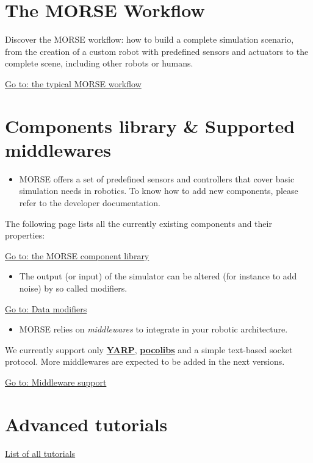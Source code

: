 \documentclass[twoside,a4paper,10pt]{report}
\newcommand{\dokutitleleveltwo}[1]{\section{#1}}
\newcommand{\dokubold}[1]{\textbf{#1}}
\newcommand{\dokuitalic}[1]{\textsl{#1}}
\newcommand{\dokuitem}{\item}
\begin{document}
\dokutitleleveltwo{The MORSE Workflow}
\label{2963f1f90771a121484ee5fd4a4251c0}%

Discover the MORSE workflow: how to build a complete simulation scenario, from 
the creation of a custom robot with predefined sensors and actuators to the 
complete scene, including other robots or humans.

\hyperref[514bac84019bd5e09c0e2b525b09f429]{ Go to: the typical MORSE workflow}


\dokutitleleveltwo{Components library \& Supported middlewares}
\label{0c88d1b20b693084703691e13ff5151f}%

\begin{itemize}
\dokuitem  MORSE offers a set of predefined sensors and controllers that cover basic simulation needs in robotics. To know how to add new components, please refer to the developer documentation.
\end{itemize}

The following page lists all the currently existing components and their properties:

\hyperref[004fdec0cc1a00c19c57e892b7eb1400]{ Go to: the MORSE component library}



\begin{itemize}
\dokuitem  The output (or input) of the simulator can be altered (for instance to add noise) by so called modifiers.
\end{itemize}

\hyperref[25bc6523e9298f4691b3c8200a395d92]{ Go to: Data modifiers}



\begin{itemize}
\dokuitem  MORSE relies on \dokuitalic{middlewares} to integrate in your robotic architecture.
\end{itemize}

We currently support only \dokubold{\href{http://eris.liralab.it/yarp/}{ YARP}}, 
\dokubold{\href{https://softs.laas.fr/openrobots/wiki/pocolibs}{pocolibs}} and a simple 
text-based socket protocol. More middlewares are expected to be added in the 
next versions.

\hyperref[9a05db9c4b60b0527010fd997682f523]{ Go to: Middleware support}


\dokutitleleveltwo{Advanced tutorials}
\label{1db3103f04a8f50e1168ef3c23748f71}%

\hyperref[1db3103f04a8f50e1168ef3c23748f71]{ List of all tutorials}
\end{document}

